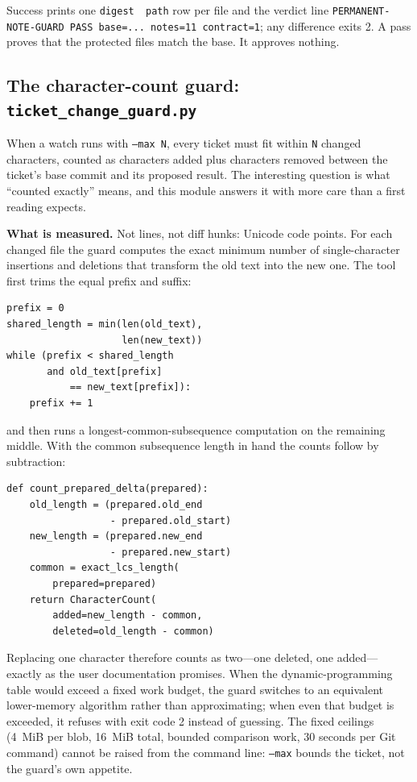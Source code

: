 \documentclass[10pt,aps,prd,twocolumn,nofootinbib]{revtex4-2}
\newcommand{\code}[1]{\texttt{#1}}
\newcommand{\file}[1]{\texttt{#1}}
\begin{document}
Success prints one \code{digest~~path} row per file and the verdict
line \code{PERMANENT-NOTE-GUARD PASS base=... notes=11 contract=1};
any difference exits 2.  A pass proves that the protected files match
the base.  It approves nothing.

\subsection{The character-count guard:
\file{ticket\_change\_guard.py}}
\label{sec:change-guard}

When a watch runs with \code{--max N}, every ticket must fit within
\code{N} changed characters, counted as characters added plus
characters removed between the ticket's base commit and its proposed
result.  The interesting question is what ``counted exactly'' means,
and this module answers it with more care than a first reading
expects.

\textbf{What is measured.}  Not lines, not diff hunks: Unicode code
points.  For each changed file the guard computes the exact minimum
number of single-character insertions and deletions that transform the
old text into the new one.  The tool first trims the equal prefix and
suffix:

\begin{verbatim}
prefix = 0
shared_length = min(len(old_text),
                    len(new_text))
while (prefix < shared_length
       and old_text[prefix]
           == new_text[prefix]):
    prefix += 1
\end{verbatim}

\noindent and then runs a longest-common-subsequence computation on the
remaining middle.  With the common subsequence length in hand the
counts follow by subtraction:

\begin{verbatim}
def count_prepared_delta(prepared):
    old_length = (prepared.old_end
                  - prepared.old_start)
    new_length = (prepared.new_end
                  - prepared.new_start)
    common = exact_lcs_length(
        prepared=prepared)
    return CharacterCount(
        added=new_length - common,
        deleted=old_length - common)
\end{verbatim}

Replacing one character therefore counts as two---one deleted, one
added---exactly as the user documentation promises.  When the
dynamic-programming table would exceed a fixed work budget, the guard
switches to an equivalent lower-memory algorithm rather than
approximating; when even that budget is exceeded, it refuses with exit
code 2 instead of guessing.  The fixed ceilings (4~MiB per blob,
16~MiB total, bounded comparison work, 30 seconds per Git command)
cannot be raised from the command line: \code{--max} bounds the
ticket, not the guard's own appetite.
\end{document}
